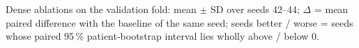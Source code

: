 \begin{table}[htbp]
\centering
\caption[Dense network: ablations (validation)]{Dense ablations on the validation fold: mean $\pm$ SD over seeds 42--44; $\Delta$ = mean paired difference with the baseline of the same seed; seeds better / worse = seeds whose paired 95\,\% patient-bootstrap interval lies wholly above / below 0.}
\label{tab:dense_ablations}
\small
\begin{adjustbox}{max width=\textwidth}

\end{adjustbox}
\end{table}
